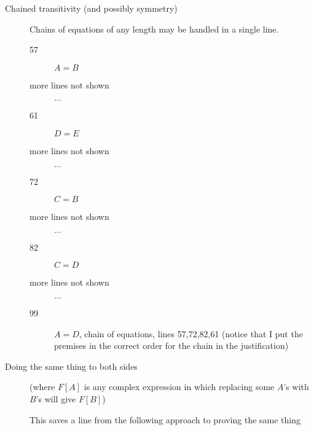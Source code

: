 \documentclass[12pt]{article}
\begin{document}
\begin{description}
\item[Chained transitivity (and possibly symmetry)]

Chains of equations of any length may be handled in a single line.

\begin{description}

\item[57]  $A=B$

\item[more lines not shown] $\ldots$

\item[61]  $D=E$

\item[more lines not shown] $\ldots$

\item[72]  $C=B$

\item[more lines not shown] $\ldots$

\item[82]  $C=D$

\item[more lines not shown] $\ldots$

\item[99]  $A=D$, chain of equations, lines 57,72,82,61  (notice that I put the premises in the correct order for the chain in the justification)

\end{description}

\item[Doing the same thing to both sides]


(where $F[A]$ is any complex expression in which replacing some $A$'s with $B$'s will give $F[B]$)

\newpage

This saves a line from the following approach to proving the same thing

\begin{description}


\end{description}
\end{description}
\end{document}
